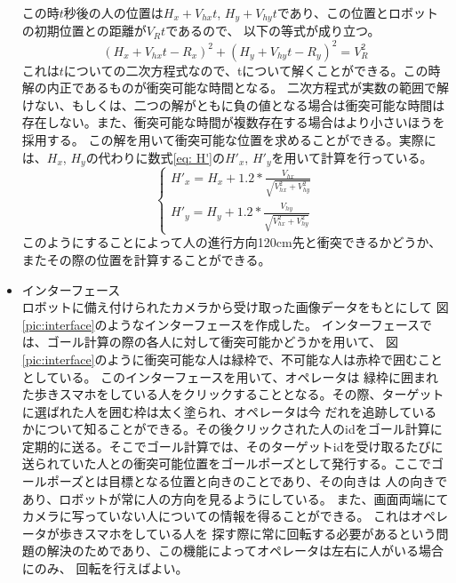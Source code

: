\documentclass{kuisthesis}
\begin{document}
\begin{itemize}
\begin{table}[H]
\end{table}
この時$t$秒後の人の位置は$H_x + V_{hx}t$, $H_y + V_{hy}t$であり、この位置とロボットの初期位置との距離が$V_Rt$であるので、
以下の等式が成り立つ。\begin{equation}(H_x + V_{hx}t - R_x)^{2} + (H_y + V_{hy}t - R_y)^2 = V_R^2\end{equation}
これは$t$についての二次方程式なので、tについて解くことができる。この時解の内正であるものが衝突可能な時間となる。
二次方程式が実数の範囲で解けない、もしくは、二つの解がともに負の値となる場合は衝突可能な時間は存在しない。また、衝突可能な時間が複数存在する場合はより小さいほうを採用する。
この解を用いて衝突可能な位置を求めることができる。実際には、$H_x$, $H_y$の代わりに数式\ref{eq: H'}の$H'_x$, $H'_y$を用いて計算を行っている。
\begin{equation}
  \label{eq: H'}
\left\{\begin{array}{l}
H'_x = H_x + 1.2*\frac{V_{hx}}{\sqrt{{V_{hx}^2 + V_{hy}^2}}}\\
H'_y = H_y + 1.2 * \frac{V_{hy}}{\sqrt{V_{hx}^2 + V_{hy}^2}}
\end{array}\right.
\end{equation}
このようにすることによって人の進行方向120cm先と衝突できるかどうか、またその際の位置を計算することができる。
  \item インターフェース \\
  ロボットに備え付けられたカメラから受け取った画像データをもとにして
  図\ref{pic:interface}のようなインターフェースを作成した。
  インターフェースでは、ゴール計算の際の各人に対して衝突可能かどうかを用いて、
  図\ref{pic:interface}のように衝突可能な人は緑枠で、不可能な人は赤枠で囲むこととしている。
  このインターフェースを用いて、オペレータは
  緑枠に囲まれた歩きスマホをしている人をクリックすることとなる。その際、ターゲットに選ばれた人を囲む枠は太く塗られ、オペレータは今
  だれを追跡しているかについて知ることができる。その後クリックされた人のidをゴール計算に定期的に送る。そこでゴール計算では、そのターゲットidを受け取るたびに
  送られていた人との衝突可能位置をゴールポーズとして発行する。ここでゴールポーズとは目標となる位置と向きのことであり、その向きは
  人の向きであり、ロボットが常に人の方向を見るようにしている。
  また、画面両端にてカメラに写っていない人についての情報を得ることができる。
  これはオペレータが歩きスマホをしている人を
  探す際に常に回転する必要があるという問題の解決のためであり、この機能によってオペレータは左右に人がいる場合にのみ、
  回転を行えばよい。
  \begin{figure}[h]
  

\end{figure}
\end{itemize}
\end{document}

